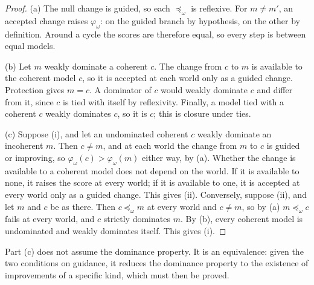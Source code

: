 \documentclass[11pt]{article}
\theoremstyle{definition}
\theoremstyle{remark}
\begin{document}
\begin{proof}
(a) The null change is guided, so each $\preceq_\omega$ is reflexive. For $m\ne m'$, an accepted change raises $\varphi_\omega$: on the guided branch by hypothesis, on the other by definition. Around a cycle the scores are therefore equal, so every step is between equal models.

(b) Let $m$ weakly dominate a coherent $c$. The change from $c$ to $m$ is available to the coherent model $c$, so it is accepted at each world only as a guided change. Protection gives $m=c$. A dominator of $c$ would weakly dominate $c$ and differ from it, since $c$ is tied with itself by reflexivity. Finally, a model tied with a coherent $c$ weakly dominates $c$, so it is $c$; this is closure under ties.

(c) Suppose (i), and let an undominated coherent $c$ weakly dominate an incoherent $m$. Then $c\ne m$, and at each world the change from $m$ to $c$ is guided or improving, so $\varphi_\omega(c)>\varphi_\omega(m)$ either way, by (a). Whether the change is available to a coherent model does not depend on the world. If it is available to none, it raises the score at every world; if it is available to one, it is accepted at every world only as a guided change. This gives (ii). Conversely, suppose (ii), and let $m$ and $c$ be as there. Then $c\preceq_\omega m$ at every world and $c\ne m$, so by (a) $m\preceq_\omega c$ fails at every world, and $c$ strictly dominates $m$. By (b), every coherent model is undominated and weakly dominates itself. This gives (i).
\end{proof}

Part (c) does not assume the dominance property. It is an equivalence: given the two conditions on guidance, it reduces the dominance property to the existence of improvements of a specific kind, which must then be proved.
\end{document}
